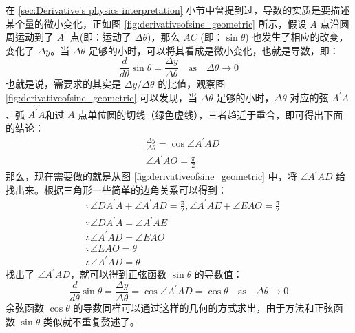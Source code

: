 \documentclass{ctexart}
\numberwithin{equation}{section}
\numberwithin{figure}{section}
\begin{document}
在 \ref{sec:Derivative's physics interpretation} 小节中曾提到过，导数的实质是要描述某个量的微小变化，正如图 \ref{fig:derivativeofsine_geometric} 所示，假设 \(A\) 点沿圆周运动到了 \(A^{\prime}\) 点(即：运动了 \(\Delta \theta\))，那么 \(AC\) (即：\(\sin \theta\)) 也发生了相应的改变，变化了 \(\Delta y\)。当 \(\Delta \theta\) 足够的小时，可以将其看成是微小变化，也就是导数，即：
\begin{equation*}
    \frac{d}{d\theta}\sin \theta = \frac{\Delta y}{\Delta \theta} \quad \text{as} \quad \Delta \theta \to 0
\end{equation*}
也就是说，需要求的其实是 \(\Delta y/\Delta \theta\) 的比值，观察图 \ref{fig:derivativeofsine_geometric} 可以发现，当 \(\Delta \theta\) 足够的小时，\(\Delta \theta\) 对应的弦 \(A^{\prime}A\)、弧 \(\overset{\frown}{A^{\prime}A}\)和过 \(A\) 点单位圆的切线（绿色虚线），三者趋近于重合，即可得出下面的结论：
\begin{equation*}
    \begin{aligned}
         & \frac{\Delta y}{\Delta \theta}  = \cos\angle A^{\prime}AD \\
         & \angle A^{\prime}AO             = \frac{\pi}{2}
    \end{aligned}
\end{equation*}
那么，现在需要做的就是从图 \ref{fig:derivativeofsine_geometric} 中，将 \(\angle A^{\prime}AD\) 给找出来。根据三角形一些简单的边角关系可以得到：
\begin{equation*}
    \begin{aligned}
         & \because \angle DA^{\prime}A + \angle A^{\prime}AD  = \frac{\pi}{2},\angle A^{\prime}AE+\angle EAO             = \frac{\pi}{2} \\
         & \because \angle DA^{\prime}A                        = \angle A^{\prime}AE                                                      \\
         & \therefore \angle A^{\prime}AD = \angle EAO                                                                                    \\
         & \because \angle EAO                                = \theta                                                                    \\
         & \therefore \angle A^{\prime}AD = \theta
    \end{aligned}
\end{equation*}
找出了  \(\angle A^{\prime}AD\)，就可以得到正弦函数 \(\sin \theta\) 的导数值：
\begin{equation}
    \frac{d}{d\theta}\sin \theta = \frac{\Delta y}{\Delta \theta} = \cos\angle A^{\prime}AD = \cos \theta \quad \text{as} \quad \Delta \theta \to 0
\end{equation}
余弦函数 \(\cos \theta\) 的导数同样可以通过这样的几何的方式求出，由于方法和正弦函数 \(\sin \theta\) 类似就不重复赘述了。
\end{document}
